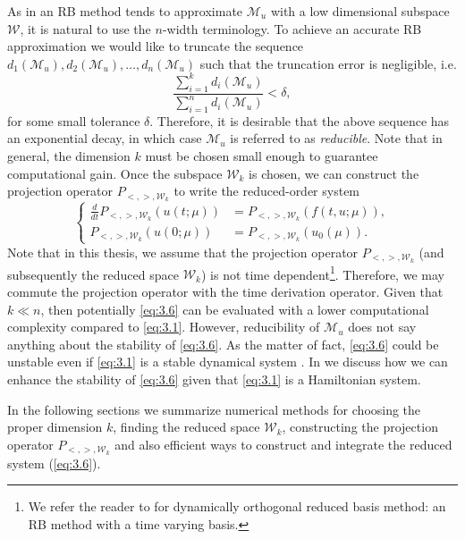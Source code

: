 As in an RB method tends to approximate $\mathcal M_u$ with a low dimensional subspace $\mathcal W$, it is natural to use the $n$-width terminology. To achieve an accurate RB approximation we would like to truncate the sequence $d_1(\mathcal M_u),d_2(\mathcal M_u),\dots, d_n(\mathcal M_u)$ such that the truncation error is negligible, i.e.
\begin{equation} \label{eq:3.5}
	\frac{\sum_{i=1}^k d_i(\mathcal M_u) }{\sum_{i=1}^n d_i(\mathcal M_u) } < \delta,
\end{equation}
for some small tolerance $\delta$. Therefore, it is desirable that the above sequence has an exponential decay, in which case $\mathcal M_u$ is referred to as \emph{reducible}. Note that in general, the dimension $k$ must be chosen small enough to guarantee computational gain. Once the subspace $\mathcal W_k$ is chosen, we can construct the projection operator $P_{<,>,\mathcal W_k}$ to write the reduced-order system
\begin{equation} \label{eq:3.6}
\left\{
\begin{aligned}
	\frac d{dt} P_{<,>,\mathcal W_k}(u(t;\mu)) &= P_{<,>,\mathcal W_k}(f(t,u;\mu)),\\
	P_{<,>,\mathcal W_k}(u(0;\mu)) &= P_{<,>,\mathcal W_k}( u_0(\mu) ).
\end{aligned}
\right.
\end{equation}
Note that in this thesis, we assume that the projection operator $P_{<,>,\mathcal W_k}$ (and subsequently the reduced space $\mathcal W_k$) is not time dependent\footnote{We refer the reader to \cite{doi:10.1137/140967787,doi:10.1137/16M1095202} for dynamically orthogonal reduced basis method: an RB method with a time varying basis.}. Therefore, we may commute the projection operator with the time derivation operator. Given that $k \ll n$, then potentially \cref{eq:3.6} can be evaluated with a lower computational complexity compared to \cref{eq:3.1}. However, reducibility of $\mathcal M_u$ does not say anything about the stability of \cref{eq:3.6}. As the matter of fact, \cref{eq:3.6} could be unstable even if \cref{eq:3.1} is a stable dynamical system \cite{doi:10.1137/140978922,doi:10.1137/17M1111991}. In  we discuss how we can enhance the stability of \cref{eq:3.6} given that \cref{eq:3.1} is a Hamiltonian system.

In the following sections we summarize numerical methods for choosing the proper dimension $k$, finding the reduced space $\mathcal W_k$, constructing the projection operator $P_{<,>,\mathcal W_k}$ and also efficient ways to construct and integrate the reduced system (\ref{eq:3.6}).

